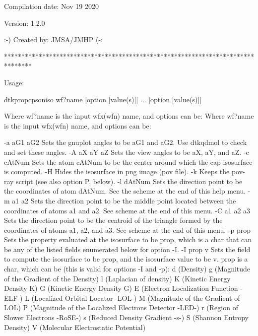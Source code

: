                          Compilation date: Nov 19 2020

                                 Version: 1.2.0

                         :-) Created by: JMSA/JMHP (-:

********************************************************************************


Usage:

	dtkpropcpsoniso wf?name [option [value(s)]] ... [option [value(s)]]

Where wf?name is the input wfx(wfn) name, and options can be:
Where wf?name is the input wfx(wfn) name, and options can be:

  -a aG1 aG2	Sets the gnuplot angles to be aG1 and aG2.
            	  Use dtkqdmol to check and set these angles.
  -A aX aY aZ	Sets the view angles to be aX, aY, and aZ.
  -c cAtNum 	Sets the atom cAtNum to be the center around which the
            	  cap isosurface is computed.
  -H        	Hides the isosurface in png image (pov file).
  -k        	Keeps the pov-ray script (see also option P, below).
  -l dAtNum 	Sets the direction point to be the coordinates of atom
            	  dAtNum. See the scheme at the end of this help menu.
  -m a1 a2  	Sets the direction point to be the middle point located
            	  between the coordinates of atoms a1 and a2.
            	  See scheme at the end of this menu.
  -C a1 a2 a3	Sets the direction point to be the centroid of the
            	  triangle formed by the coordinates of atoms
            	  a1, a2, and a3.
            	  See scheme at the end of this menu.
  -p prop   	Sets the property evaluated at the isosurface to be
            	  prop, which is a char that can be any of the listed
            	  fields enumerated below for option -I.
  -I prop v 	Sets the field to compute the isosurface to be prop,
            	  and the isosurface value to be v. prop is a char,
            	  which can be (this is valid for options -I and -p):
         		d (Density)
         		g (Magnitude of the Gradient of the Density)
         		l (Laplacian of density)
         		K (Kinetic Energy Density K)
         		G (Kinetic Energy Density G)
         		E (Electron Localization Function -ELF-)
         		L (Localized Orbital Locator -LOL-)
         		M (Magnitude of the Gradient of LOL)
         		P (Magnitude of the Localized Electrons Detector -LED-)
         		r (Region of Slower Electrons -RoSE-)
         		s (Reduced Density Gradient -s-)
         		S (Shannon Entropy Density)
         		V (Molecular Electrostatic Potential)
